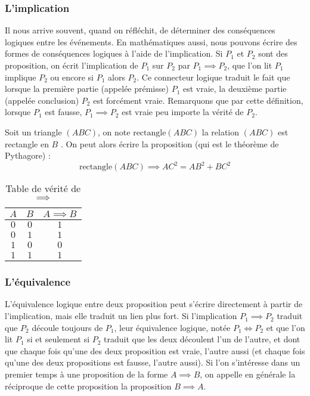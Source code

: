 \subsubsection{L'implication}

Il nous arrive souvent, quand on réfléchit, de déterminer des conséquences logiques entre les événements. En mathématiques aussi, nous pouvons écrire des formes de conséquences logiques à l'aide de l'implication. Si $P_1$ et $P_2$ sont des proposition, on écrit l'implication de $P_1$ sur $P_2$ par $P_1\implies P_2$, que l'on lit \og $P_1$ implique $P_2$ \fg{} ou encore \og si $P_1$ alors $P_2$\fg{}. Ce connecteur logique traduit le fait que lorsque la première partie (appelée prémisse) $P_1$ est vraie, la deuxième partie (appelée conclusion) $P_2$ est forcément vraie. Remarquons que par cette définition, lorsque $P_1$ est fausse, $P_1\implies P_2$ est vraie peu importe la vérité de $P_2$.

\begin{expl}
    Soit un triangle $(ABC)$, on note $\mathrm{rectangle}(ABC)$ la relation \og $(ABC)$ est rectangle en $B$ \fg{}. On peut alors écrire la proposition (qui est le théorème de Pythagore) : $$\mathrm{rectangle}(ABC) \implies AC^2=AB^2+BC^2$$
\end{expl}

\begin{table}[h]
            \centering
            \begin{tabular}{| c | c | c |}
                \hline
                $A$ & $B$ & $A\implies B$\\
                \hline
                $0$ & $0$ & $1$\\
                $0$ & $1$ & $1$\\
                $1$ & $0$ & $0$\\
                $1$ & $1$ & $1$\\
                \hline
            \end{tabular}
            \caption{Table de vérité de $\implies$}
    \end{table}

\subsubsection{L'équivalence}

L'équivalence logique entre deux proposition peut s'écrire directement à partir de l'implication, mais elle traduit un lien plus fort. Si l'implication $P_1\implies P_2$ traduit que $P_2$ découle toujours de $P_1$, leur équivalence logique, notée $P_1\iff P_2$ et que l'on lit \og $P_1$ si et seulement si $P_2$ \fg{} traduit que les deux découlent l'un de l'autre, et dont que chaque fois qu'une des deux proposition est vraie, l'autre aussi (et chaque fois qu'une des deux propositions est fausse, l'autre aussi). Si l'on s'intéresse dans un premier temps à une proposition de la forme $A\implies B$, on appelle en générale la réciproque de cette proposition la proposition $B\implies A$.

